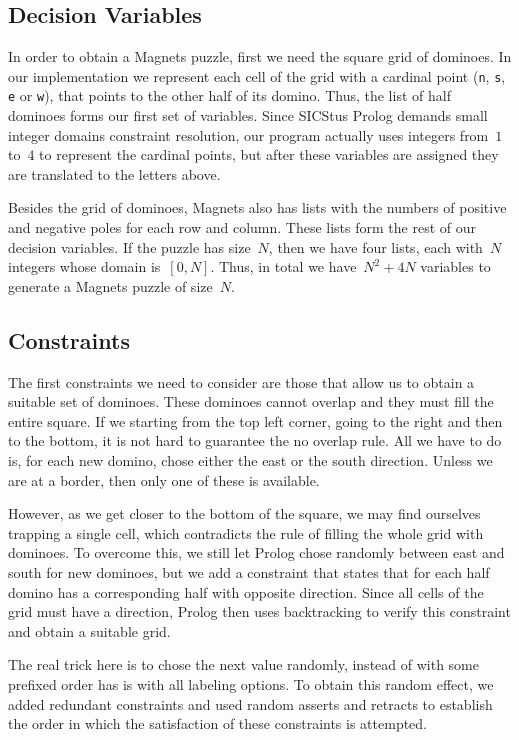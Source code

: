 \documentclass{llncs}
\begin{document}
\subsection{Decision Variables} 

In order to obtain a Magnets puzzle, first we need the square grid of dominoes. In our implementation we represent each cell of the grid with a cardinal point (\verb|n|, \verb|s|, \verb|e| or \verb|w|), that points to the other half of its domino. Thus, the list of half dominoes forms our first set of variables. Since SICStus Prolog demands small integer domains constraint resolution, our program actually uses integers from~$1$ to~$4$ to represent the cardinal points, but after these variables are assigned they are translated to the letters above.

Besides the grid of dominoes, Magnets also has lists with the numbers of positive and negative poles for each row and column. These lists form the rest of our decision variables. If the puzzle has size~$N$, then we have four lists, each with~$N$ integers whose domain is~$\left[0, N\right]$. Thus, in total we have~$N^2 + 4N$ variables to generate a Magnets puzzle of size~$N$.

\subsection{Constraints} 

The first constraints we need to consider are those that allow us to obtain a suitable set of dominoes. These dominoes cannot overlap and they must fill the entire square. If we starting from the top left corner, going to the right and then to the bottom, it is not hard to guarantee the no overlap rule. All we have to do is, for each new domino, chose either the east or the south direction. Unless we are at a border, then only one of these is available. 

However, as we get closer to the bottom of the square, we may find ourselves trapping a single cell, which contradicts the rule of filling the whole grid with dominoes. To overcome this, we still let Prolog chose randomly between east and south for new dominoes, but we add a constraint that states that for each half domino has a corresponding half with opposite direction. Since all cells of the grid must have a direction, Prolog then uses backtracking to verify this constraint and obtain a suitable grid. 

The real trick here is to chose the next value randomly, instead of with some prefixed order has is with all labeling options. To obtain this random effect, we added redundant constraints and used random asserts and retracts to establish the order in which the satisfaction of these constraints is attempted.
\end{document}
